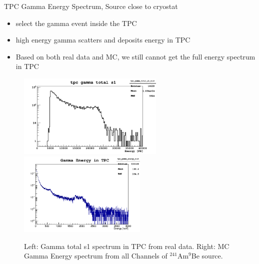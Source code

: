 \documentclass[9pt]{beamer}
\begin{document}
\begin{frame}{TPC Gamma Energy Spectrum, Source close to cryostat}
\begin{itemize}
[bullet]
\item select the gamma event inside the TPC 
\item high energy gamma scatters and deposits energy in TPC
\item Based on both real data and MC, we still cannot get the full energy spectrum in TPC 
\end{itemize}
\begin{figure}
\includegraphics[height= 4cm, width=.5\textwidth]{tpc_gamma_total_s1_Feb7PM.png}
\includegraphics[height= 4cm, width=.5\textwidth]{tpc_gamma_energy_hist_Jan24AM.png}
\caption{Left: Gamma total s1 spectrum in TPC from real data. Right: MC Gamma Energy spectrum from all Channels  of $^{241}$Am$^9$Be source.}
\end{figure}
\end{frame}
\end{document}
